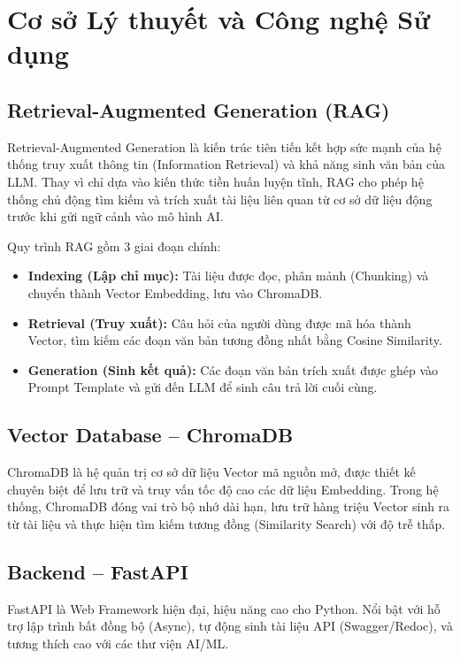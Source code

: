\section{Cơ sở Lý thuyết và Công nghệ Sử dụng}

\subsection{Retrieval-Augmented Generation (RAG)}

Retrieval-Augmented Generation là kiến trúc tiên tiến kết hợp sức mạnh của hệ thống truy xuất thông tin (Information Retrieval) và khả năng sinh văn bản của LLM. Thay vì chỉ dựa vào kiến thức tiền huấn luyện tĩnh, RAG cho phép hệ thống chủ động tìm kiếm và trích xuất tài liệu liên quan từ cơ sở dữ liệu động trước khi gửi ngữ cảnh vào mô hình AI.

Quy trình RAG gồm 3 giai đoạn chính:
\begin{itemize}[itemsep=3pt]
  \item \textbf{Indexing (Lập chỉ mục):} Tài liệu được đọc, phân mảnh (Chunking) và chuyển thành Vector Embedding, lưu vào ChromaDB.
  \item \textbf{Retrieval (Truy xuất):} Câu hỏi của người dùng được mã hóa thành Vector, tìm kiếm các đoạn văn bản tương đồng nhất bằng Cosine Similarity.
  \item \textbf{Generation (Sinh kết quả):} Các đoạn văn bản trích xuất được ghép vào Prompt Template và gửi đến LLM để sinh câu trả lời cuối cùng.
\end{itemize}

\subsection{Vector Database -- ChromaDB}

ChromaDB là hệ quản trị cơ sở dữ liệu Vector mã nguồn mở, được thiết kế chuyên biệt để lưu trữ và truy vấn tốc độ cao các dữ liệu Embedding. Trong hệ thống, ChromaDB đóng vai trò bộ nhớ dài hạn, lưu trữ hàng triệu Vector sinh ra từ tài liệu và thực hiện tìm kiếm tương đồng (Similarity Search) với độ trễ thấp.

\subsection{Backend -- FastAPI}

FastAPI là Web Framework hiện đại, hiệu năng cao cho Python. Nổi bật với hỗ trợ lập trình bất đồng bộ (Async), tự động sinh tài liệu API (Swagger/Redoc), và tương thích cao với các thư viện AI/ML.

